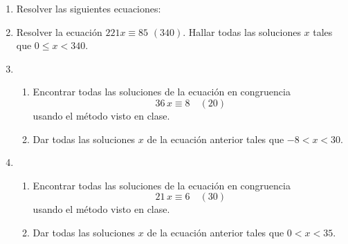 \documentclass[a4paper,12pt,twoside,spanish,reqno]{amsbook}
\numberwithin{equation}{section}
\begin{document}
\begin{enumerate}
\item Resolver las siguientes ecuaciones:


\item Resolver la ecuación $221 x \equiv 85\,\, (340)$. Hallar todas las soluciones $x$ tales que $0 \le x < 340$.


\item 
    \begin{enumerate}
        \item Encontrar todas las soluciones de la ecuación en congruencia
            \begin{equation*}
                36\,x\equiv 8 \quad (20)
            \end{equation*}
            usando el método visto en clase.
        \item Dar todas las soluciones $x$ de la ecuación anterior tales que $-8 < x < 30$.
    \end{enumerate}


\item 
    \begin{enumerate}
    \item Encontrar todas las soluciones de la ecuación en congruencia
        \begin{equation*}
            21\,x\equiv 6 \quad (30)
        \end{equation*}
        usando el método visto en clase.
    \item Dar todas las soluciones $x$ de la ecuación anterior tales que $0 < x < 35$.
    \end{enumerate}





\end{enumerate}
\end{document}
